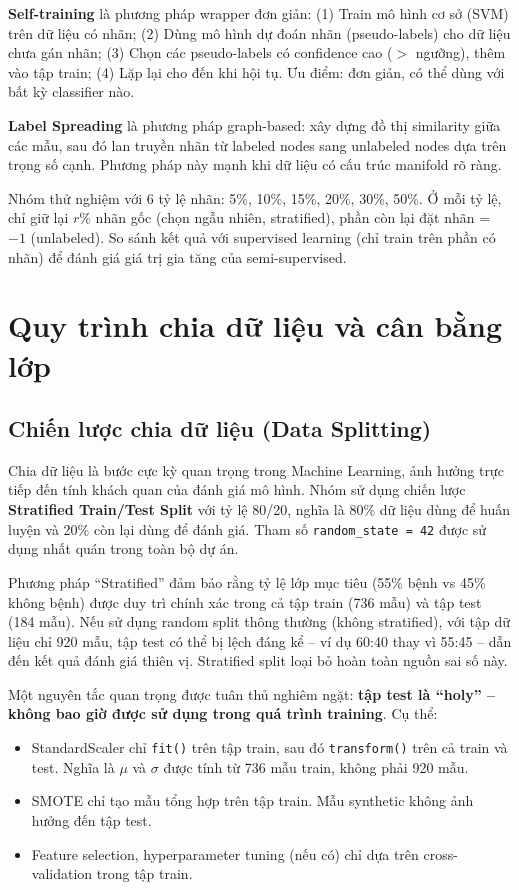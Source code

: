 \textbf{Self-training} là phương pháp wrapper đơn giản: (1) Train mô hình cơ sở (SVM) trên dữ liệu có nhãn; (2) Dùng mô hình dự đoán nhãn (pseudo-labels) cho dữ liệu chưa gán nhãn; (3) Chọn các pseudo-labels có confidence cao ($>$ ngưỡng), thêm vào tập train; (4) Lặp lại cho đến khi hội tụ. Ưu điểm: đơn giản, có thể dùng với bất kỳ classifier nào.

\textbf{Label Spreading} \cite{zhou2004learning} là phương pháp graph-based: xây dựng đồ thị similarity giữa các mẫu, sau đó lan truyền nhãn từ labeled nodes sang unlabeled nodes dựa trên trọng số cạnh. Phương pháp này mạnh khi dữ liệu có cấu trúc manifold rõ ràng.

Nhóm thử nghiệm với 6 tỷ lệ nhãn: 5\%, 10\%, 15\%, 20\%, 30\%, 50\%. Ở mỗi tỷ lệ, chỉ giữ lại $r\%$ nhãn gốc (chọn ngẫu nhiên, stratified), phần còn lại đặt nhãn = $-1$ (unlabeled). So sánh kết quả với supervised learning (chỉ train trên phần có nhãn) để đánh giá giá trị gia tăng của semi-supervised.

\section{Quy trình chia dữ liệu và cân bằng lớp}

\subsection{Chiến lược chia dữ liệu (Data Splitting)}

Chia dữ liệu là bước cực kỳ quan trọng trong Machine Learning, ảnh hưởng trực tiếp đến tính khách quan của đánh giá mô hình. Nhóm sử dụng chiến lược \textbf{Stratified Train/Test Split} với tỷ lệ 80/20, nghĩa là 80\% dữ liệu dùng để huấn luyện và 20\% còn lại dùng để đánh giá. Tham số \texttt{random\_state = 42} được sử dụng nhất quán trong toàn bộ dự án.

Phương pháp ``Stratified'' đảm bảo rằng tỷ lệ lớp mục tiêu (55\% bệnh vs 45\% không bệnh) được duy trì chính xác trong cả tập train (736 mẫu) và tập test (184 mẫu). Nếu sử dụng random split thông thường (không stratified), với tập dữ liệu chỉ 920 mẫu, tập test có thể bị lệch đáng kể -- ví dụ 60:40 thay vì 55:45 -- dẫn đến kết quả đánh giá thiên vị. Stratified split loại bỏ hoàn toàn nguồn sai số này.

Một nguyên tắc quan trọng được tuân thủ nghiêm ngặt: \textbf{tập test là ``holy'' -- không bao giờ được sử dụng trong quá trình training}. Cụ thể:
\begin{itemize}
    \item StandardScaler chỉ \texttt{fit()} trên tập train, sau đó \texttt{transform()} trên cả train và test. Nghĩa là $\mu$ và $\sigma$ được tính từ 736 mẫu train, không phải 920 mẫu.
    \item SMOTE chỉ tạo mẫu tổng hợp trên tập train. Mẫu synthetic không ảnh hưởng đến tập test.
    \item Feature selection, hyperparameter tuning (nếu có) chỉ dựa trên cross-validation trong tập train.
\end{itemize}

